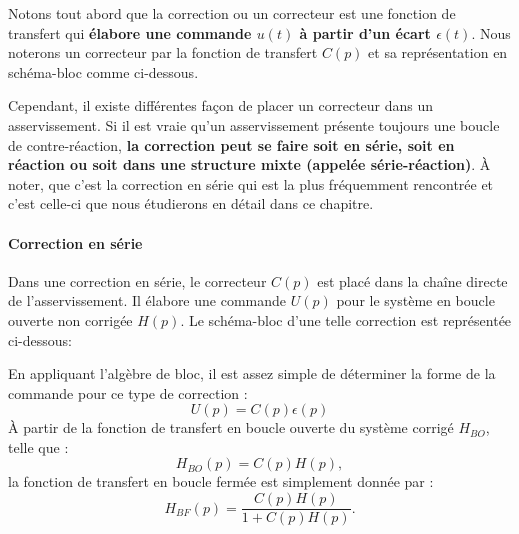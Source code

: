 Notons tout abord que la correction ou un correcteur est une fonction 
de transfert qui \textbf{élabore une commande $u(t)$ à partir d'un écart 
$\epsilon(t)$}. Nous noterons un correcteur par la fonction de transfert
$C(p)$ et sa représentation en schéma-bloc comme ci-dessous.
\begin{center}
    
\end{center}
Cependant, il existe différentes façon de placer un correcteur dans un 
asservissement. Si il est vraie qu'un asservissement présente toujours une
boucle de contre-réaction, \textbf{la correction peut se faire soit en série, 
soit en réaction ou soit dans une structure mixte (appelée série-réaction)}.
À noter, que c'est la correction en série qui est la plus fréquemment rencontrée
et c'est celle-ci que nous étudierons en détail dans ce chapitre.
\paragraph{Correction en série}
Dans une correction en série, le correcteur $C(p)$ est placé dans la chaîne
directe de l'asservissement. Il élabore une commande $U(p)$ pour le système en 
boucle ouverte non corrigée $H(p)$. Le schéma-bloc
d'une telle correction est représentée ci-dessous:
\begin{center}
    
\end{center}
En appliquant l'algèbre de bloc, il est assez simple de déterminer la forme de
la commande pour ce type de correction :
\[
    U(p)=C(p)\epsilon(p)
\]
À partir de la fonction de transfert en boucle ouverte du système corrigé 
$H_{BO}$, telle que :
\[
    H_{BO}(p)=C(p)H(p),
\]
la fonction de transfert en boucle fermée est simplement donnée par :
\[
    H_{BF}(p)=\dfrac{C(p)H(p)}{1+C(p)H(p)}.
\]
